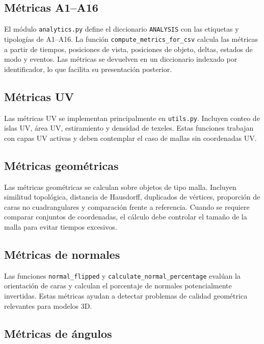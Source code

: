 \subsection{Métricas A1--A16}
\label{subsec:d-analisis-a1-A16}

El módulo \texttt{analytics.py} define el diccionario \texttt{ANALYSIS} con las etiquetas y tipologías de A1--A16. La función \texttt{compute\_metrics\_for\_csv} calcula las métricas a partir de tiempos, posiciones de vista, posiciones de objeto, deltas, estados de modo y eventos. Las métricas se devuelven en un diccionario indexado por identificador, lo que facilita su presentación posterior.

\subsection{Métricas UV}
\label{subsec:d-analisis-uv}

Las métricas UV se implementan principalmente en \texttt{utils.py}. Incluyen conteo de islas UV, área UV, estiramiento y densidad de texeles. Estas funciones trabajan con capas UV activas y deben contemplar el caso de mallas sin coordenadas UV.

\subsection{Métricas geométricas}
\label{subsec:d-analisis-geometricas}

Las métricas geométricas se calculan sobre objetos de tipo malla. Incluyen similitud topológica, distancia de Hausdorff, duplicados de vértices, proporción de caras no cuadrangulares y comparación frente a referencia. Cuando se requiere comparar conjuntos de coordenadas, el cálculo debe controlar el tamaño de la malla para evitar tiempos excesivos.

\subsection{Métricas de normales}
\label{subsec:d-analisis-normales}

Las funciones \texttt{normal\_flipped} y \texttt{calculate\_normal\_percentage} evalúan la orientación de caras y calculan el porcentaje de normales potencialmente invertidas. Estas métricas ayudan a detectar problemas de calidad geométrica relevantes para modelos 3D.

\subsection{Métricas de ángulos}
\label{subsec:d-analisis-angulos}

